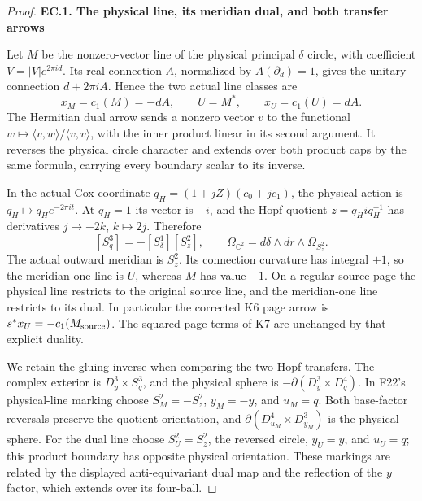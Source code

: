 \begin{proof}
\par

\medskip\noindent\textbf{EC.1. The physical line, its meridian dual, and both transfer arrows}

\par\nobreak

Let \(M\) be the nonzero-vector line of the physical principal \(\delta\)
circle, with coefficient \(V=|V|e^{2\pi i d}\). Its real connection
\(A\), normalized by \(A(\partial_d)=1\), gives the unitary connection
\(d+2\pi i A\). Hence the two actual line classes are
\[
 x_M=c_1(M)=-dA,\qquad U=M^*,\qquad x_U=c_1(U)=dA.       \tag{EC.1}
\]
The Hermitian dual arrow sends a nonzero vector \(v\) to the
functional \(w\mapsto\langle v,w\rangle/\langle v,v\rangle\),
with the inner product linear in its second argument. It reverses
the physical circle character and extends over both product caps
by the same formula, carrying every boundary scalar to its inverse.

In the actual Cox coordinate
\(q_H=(1+jZ)(c_0+j\overline{c_1})\), the physical action is
\(q_H\mapsto q_He^{-2\pi i t}\). At \(q_H=1\) its vector is
\(-i\), and the Hopf quotient \(z=q_Hiq_H^{-1}\) has derivatives
\(j\mapsto-2k\), \(k\mapsto2j\). Therefore
\[
 [S^3_q]=-[S^1_\delta][S^2_z],\qquad
 \Omega_{\mathbb C^2}=d\delta\wedge dr\wedge\Omega_{S^2_z}.
                                                               \tag{EC.2}
\]
The actual outward meridian is \(S^2_z\). Its connection curvature
has integral \(+1\), so the meridian-one line is \(U\), whereas
\(M\) has value \(-1\). On a regular source page the physical
line restricts to the original source line, and the meridian-one
line restricts to its dual. In particular the corrected K6 page
arrow is \(s^*x_U=-c_1(M_{\rm source})\). The squared page terms
of K7 are unchanged by that explicit duality.

We retain the gluing inverse when comparing the two Hopf transfers.
The complex exterior is \(D^3_y\times S^3_q\), and the physical
sphere is \(-\partial(D^3_y\times D^4_q)\). In F22's physical-line
marking choose \(S^2_M=-S^2_z\), \(y_M=-y\), and \(u_M=q\).
Both base-factor reversals preserve the quotient orientation, and
\(\partial(D^4_{u_M}\times D^3_{y_M})\) is the physical sphere.
For the dual line choose \(S^2_U=S^2_z\), the reversed circle,
\(y_U=y\), and \(u_U=q\); this product boundary has opposite
physical orientation. These markings are related by the displayed
anti-equivariant dual map and the reflection of the \(y\) factor,
which extends over its four-ball.


\end{proof}
